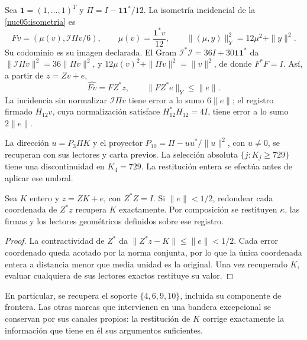 Sea \(\mathbf1=(1,\ldots,1)^T\) y
\(\Pi=I-\mathbf1\mathbf1^*/12\). La isometría incidencial de
la \cref{nuc05:isometria} es
\begin{equation}
 Fv=(\mu(v),\mathcal I\Pi v/6),\qquad
 \mu(v)=\frac{\mathbf1^*v}{12},\qquad
 \|(\mu,y)\|_Y^2=12\mu^2+\|y\|^2.
 \label{lib04:f-incidencia}
\end{equation}
Su codominio es su imagen declarada. El Gram
\(\mathcal I^*\mathcal I=36I+30\mathbf1\mathbf1^*\) da
\(\|\mathcal I\Pi v\|^2=36\|\Pi v\|^2\), y
\(12\mu(v)^2+\|\Pi v\|^2=\|v\|^2\), de donde \(F^*F=I\).
Así, a partir de \(z=Zv+e\),
\begin{equation}
 \widehat{Fv}=FZ^*z,\qquad \|FZ^*e\|_Y\leq\|e\|.
 \label{lib04:error-incidencia}
\end{equation}
La incidencia sin normalizar \(\mathcal I\Pi v\) tiene error a
lo sumo \(6\|e\|\); el registro firmado \(H_{12}v\), cuya
normalización satisface \(H_{12}^*H_{12}=4I\), tiene error a lo sumo
\(2\|e\|\).

La dirección \(u=P_3\Pi K\) y el proyector
\(P_{10}=\Pi-uu^*/\|u\|^2\), con \(u\neq0\), se recuperan
con sus lectores y carta previos. La selección absoluta
\(\{j:K_j\geq729\}\) tiene una discontinuidad en \(K_4=729\).
La restitución entera se efectúa antes de aplicar ese umbral.

\begin{proposition}
\label{lib04:prop-redondeo}
Sea \(K\) entero y \(z=ZK+e\), con \(Z^*Z=I\). Si
\(\|e\|<1/2\), redondear cada coordenada de \(Z^*z\) recupera
\(K\) exactamente. Por composición se restituyen \(\kappa\), las
firmas y los lectores geométricos definidos sobre ese registro.
\end{proposition}

\begin{proof}
La contractividad de \(Z^*\) da
\(\|Z^*z-K\|\leq\|e\|<1/2\). Cada error coordenado queda
acotado por la norma conjunta, por lo que la única coordenada entera
a distancia menor que media unidad es la original. Una vez
recuperado \(K\), evaluar cualquiera de sus lectores exactos
restituye su valor.
\end{proof}

En particular, se recupera el soporte \(\{4,6,9,10\}\), incluida
su componente de frontera. Las otras marcas que intervienen en una
bandera excepcional se conservan por sus canales propios: la
restitución de \(K\) corrige exactamente la información que tiene
en él sus argumentos suficientes.

